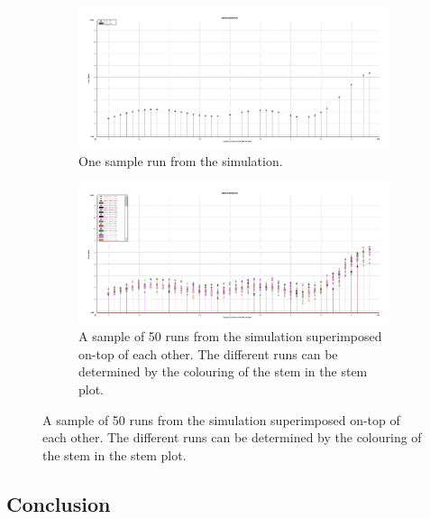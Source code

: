 \begin{figure}[!h]
    \centering
    \caption{Sample outputs from the VPI simulator.}
    \label{fig:tw:vpi_samp_op}
    \begin{subfigure}{\textwidth}
        \centering
        \caption{One sample run from the simulation.}
        \includegraphics[width=\textwidth]{images/technical_work/section_2_data generation/sample_output_1.pdf}
        
        \label{fig:tw:vpi_1_op}
    \end{subfigure}
    
    \begin{subfigure}{\textwidth}
        \centering
        \caption{A sample of 50 runs from the simulation superimposed on-top of each other. The different runs can be determined by the colouring of the stem in the stem plot.}
        \includegraphics[width=\textwidth]{images/technical_work/section_2_data generation/sample_output_50.pdf}
        
        \label{fig:tw:vpi_50_op}
    \end{subfigure}
\end{figure}
\FloatBarrier
\subsection{Conclusion}



